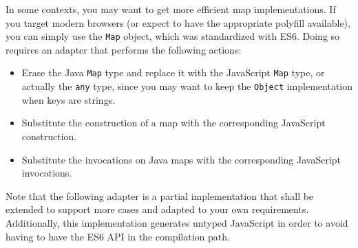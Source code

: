 \documentclass[a4paper]{report}
\begin{document}
In some contexts, you may want to get more efficient map implementations. If you target modern browsers (or expect to have the appropriate polyfill available), you can simply use the \texttt{Map} object, which was standardized with ES6. Doing so requires an adapter that performs the following actions:

\begin{itemize}
 \item Erase the Java \texttt{Map} type and replace it with the JavaScript \texttt{Map} type, or actually the \texttt{any} type, since you may want to keep the \texttt{Object} implementation when keys are strings. 
\item Substitute the construction of a map with the corresponding JavaScript construction.
\item Substitute the invocations on Java maps with the corresponding JavaScript invocations.
 \end{itemize} 

Note that the following adapter is a partial implementation that shall be extended to support
more cases and adapted to your own requirements. Additionally, this implementation generates untyped JavaScript in order to avoid having to have the ES6 API in the compilation path.
\end{document}
